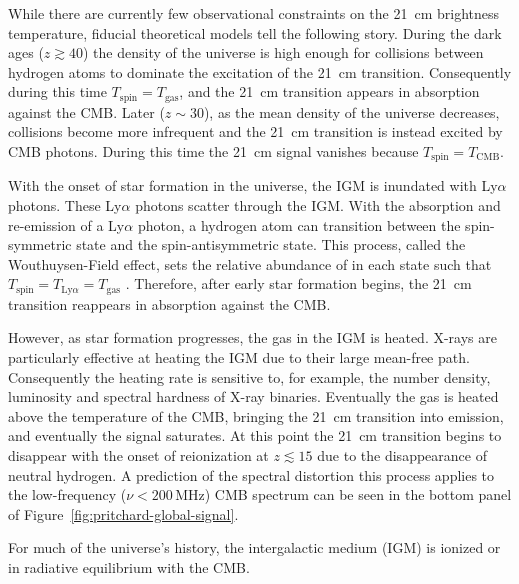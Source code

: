 \begin{bibunit}
While there are currently few observational constraints on the 21~cm brightness temperature,
fiducial theoretical models tell the following story.  During the dark
ages ($z \gtrsim 40$) the density of the universe is high enough for collisions between hydrogen
atoms to dominate the excitation of the 21~cm transition.  Consequently during this time
$T_\text{spin} = T_\text{gas}$, and the 21~cm transition appears in absorption against the CMB.
Later ($z \sim 30$), as the mean density of the universe decreases, collisions become more
infrequent and the 21~cm transition is instead excited by CMB photons. During this time the 21~cm
signal vanishes because $T_\text{spin} = T_\text{CMB}$.

With the onset of star formation in the universe, the IGM is inundated with Ly$\alpha$ photons.
These Ly$\alpha$ photons scatter through the IGM. With the absorption and re-emission of a
Ly$\alpha$ photon, a hydrogen atom can transition between the spin-symmetric state and the
spin-antisymmetric state. This process, called the Wouthuysen-Field effect, sets the relative
abundance of  in each state such that $T_\text{spin} = T_{\text{Ly}\alpha} = T_\text{gas}$
\citep{1952AJ.....57R..31W,1958PIRE...46..240F}. Therefore, after early star formation begins, the
21~cm transition reappears in absorption against the CMB.

However, as star formation progresses, the gas in the IGM is heated. X-rays are particularly
effective at heating the IGM due to their large mean-free path. Consequently the heating rate is
sensitive to, for example, the number density, luminosity and spectral hardness of X-ray binaries.
Eventually the gas is heated above the temperature of the CMB, bringing the 21~cm transition into
emission, and eventually the signal saturates. At this point the 21~cm
transition begins to disappear with the onset of reionization at $z \lesssim 15$ due to the
disappearance of neutral hydrogen. A prediction of the spectral distortion this process applies to
the low-frequency ($\nu < 200\,\text{MHz}$) CMB spectrum can be seen in the bottom panel of
Figure~\ref{fig:pritchard-global-signal}.









For much of the universe's history, the intergalactic medium (IGM) is ionized or in radiative
equilibrium with the CMB.






\end{bibunit}
